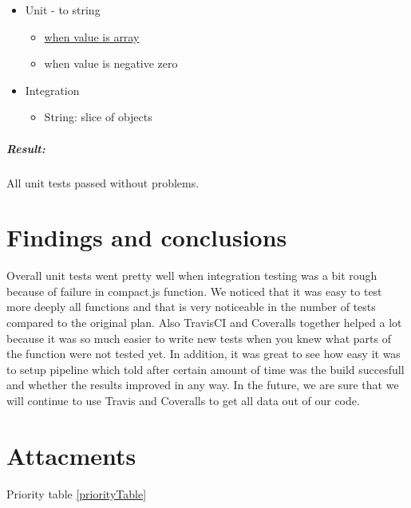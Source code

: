 \documentclass[a4paper, 12pt]{article}
\begin{document}
		\begin{itemize}
		\item
		Unit - to string
		
		\begin{itemize}
			\item
			\underline{when value is array}
			\item
			when value is negative zero
		\end{itemize}
		\item
		Integration
		
		\begin{itemize}
			\item
			String: slice of objects
		\end{itemize}
		\end{itemize}
		
		\hypertarget{header-n573}{%
		\subparagraph{Result:}\label{header-n573}}
		
		All unit tests passed without problems.

\section{Findings and conclusions}
Overall unit tests went pretty well when integration testing was a bit rough because of failure in compact.js function. We noticed that it was easy to test more deeply all functions and that is very noticeable in the number of tests compared to the original plan. Also TravisCI and Coveralls together helped a lot because it was so much easier to write new tests when you knew what parts of the function were not tested yet. In addition, it was great to see how easy it was to setup pipeline which told after certain amount of time was the build succesfull and whether the results improved in any way. In the future, we are sure that we will continue to use Travis and Coveralls to get all data out of our code. 






\section*{Attacments}

Priority table \ref{priorityTable}
\end{document}

